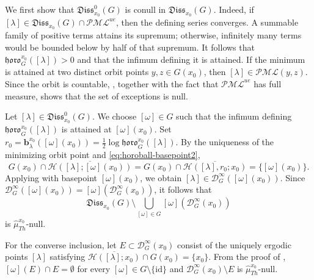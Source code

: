 \documentclass[dvipdfmx]{amsart}
\theoremstyle{remark}
\newcommand{\PThursM}{\hat{\mu}_{Th}}
\newcommand{\pml}{\mathcal{PML}}
\newcommand{\busemann}{\boldsymbol{b}}
\newcommand{\horo}{\mathfrak{horo}}
\newcommand{\Dirichlet}{\mathscr{D}}
\newcommand{\horos}{\mathscr{H}}
\newcommand{\dissipativepart}{\mathfrak{Diss}}
\begin{document}
We first show that $\dissipativepart^0_{x_0}(G)$ is conull in $\dissipativepart_{x_0}(G)$. Indeed, if $[\lambda]\in\dissipativepart_{x_0}(G)\cap\pml^{ue}$, then the defining series converges. A summable family of positive terms attains its supremum; otherwise, infinitely many terms would be bounded below by half of that supremum. It follows that $\horo^{x_0}_G([\lambda])>0$ and that the infimum defining it is attained. If the minimum is attained at two distinct orbit points $y,z\in G(x_0)$, then $[\lambda]\in\pml(y,z)$. Since the orbit is countable, , together with the fact that $\pml^{ue}$ has full measure, shows that the set of exceptions is null.

Let $[\lambda]\in\dissipativepart^0_{x_0}(G)$. We choose $[\omega]\in G$ such that the infimum defining $\horo^{x_0}_G([\lambda])$ is attained at $[\omega](x_0)$.
Set $r_0=\busemann^{x_0}_\lambda([\omega](x_0))=\frac{1}{2}\log\horo^{x_0}_G([\lambda])$. By the uniqueness of the minimizing orbit point and \eqref{eq:horoball-basepoint2},
\[
G(x_0)\cap\overline{\horos([\lambda];[\omega](x_0))}
=G(x_0)\cap\overline{\horos([\lambda],r_0;x_0)}
=\{[\omega](x_0)\}.
\]
Applying  with basepoint $[\omega](x_0)$, we obtain $[\lambda]\in\Dirichlet^\infty_G([\omega](x_0))$. Since
$\Dirichlet^\infty_G([\omega](x_0))=[\omega](\Dirichlet^\infty_G(x_0))$, it follows that
\[
\dissipativepart_{x_0}(G)
\setminus\bigcup_{[\omega]\in G}
[\omega](\Dirichlet^\infty_G(x_0))
\]
is $\PThursM^{x_0}$-null.

For the converse inclusion, let $E\subset\Dirichlet^\infty_G(x_0)$ consist of the uniquely ergodic points $[\lambda]$ satisfying
$\overline{\horos([\lambda];x_0)}\cap G(x_0)=\{x_0\}$. 
From the proof of , $[\omega](E)\cap E=\emptyset$ for every $[\omega]\in G\setminus\{\mathrm{id}\}$ and $\Dirichlet^\infty_G(x_0)\setminus E$ is $\PThursM^{x_0}$-null.
\end{document}

